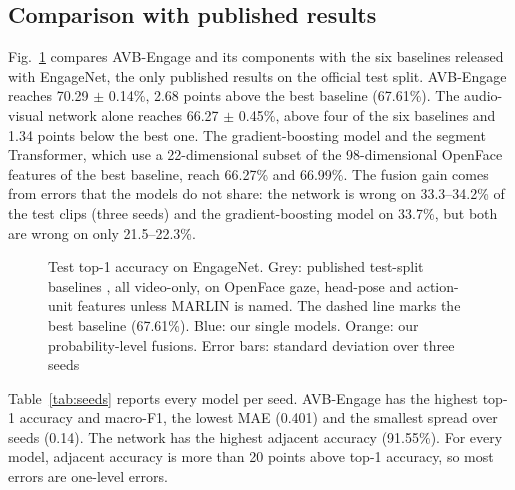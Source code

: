 \documentclass[pdflatex,iicol,sn-basic]{sn-jnl}
\newcommand{\ournet}{AVB-Engage}
\begin{document}
\subsection{Comparison with published results}\label{sec:res_sota}

Fig.~\ref{fig:results} compares \ournet{} and its components with the six baselines released with EngageNet, the only published results on the official test split. \ournet{} reaches 70.29 $\pm$ 0.14\%, 2.68 points above the best baseline (67.61\%). The audio-visual network alone reaches 66.27 $\pm$ 0.45\%, above four of the six baselines and 1.34 points below the best one. The gradient-boosting model and the segment Transformer, which use a 22-dimensional subset of the 98-dimensional OpenFace features of the best baseline, reach 66.27\% and 66.99\%. The fusion gain comes from errors that the models do not share: the network is wrong on 33.3--34.2\% of the test clips (three seeds) and the gradient-boosting model on 33.7\%, but both are wrong on only 21.5--22.3\%.

\begin{figure}[t]
\centering

\caption{Test top-1 accuracy on EngageNet. Grey: published test-split baselines \citep{singh2023engagenet}, all video-only, on OpenFace gaze, head-pose and action-unit features unless MARLIN is named. The dashed line marks the best baseline (67.61\%). Blue: our single models. Orange: our probability-level fusions. Error bars: standard deviation over three seeds}
\label{fig:results}
\end{figure}

Table~\ref{tab:seeds} reports every model per seed. \ournet{} has the highest top-1 accuracy and macro-F1, the lowest MAE (0.401) and the smallest spread over seeds (0.14). The network has the highest adjacent accuracy (91.55\%). For every model, adjacent accuracy is more than 20 points above top-1 accuracy, so most errors are one-level errors.
\end{document}
